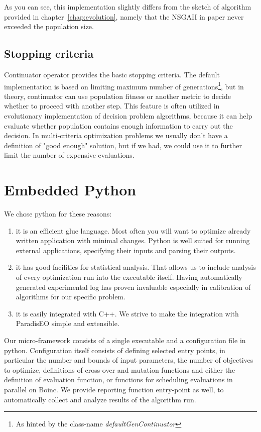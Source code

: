 \documentclass[12pt,oneside]{fithesis2}
\begin{document}
As you can see, this implementation slightly differs from the sketch of algorithm provided in chapter~\ref{chap:evolution}, namely that the NSGAII in paper\cite{deb2002fast} never exceeded the population size.

\subsection{Stopping criteria}
Continuator operator provides the basic stopping criteria. The default implementation is based on limiting maximum number of generations\footnote{As hinted by the class-name \emph{defaultGenContinuator}}, but in theory, continuator can use population fitness or another metric to decide whether to proceed with another step. This feature is often utilized in evolutionary implementation of decision problem algorithms, because it can help evaluate whether population contains enough information to carry out the decision. In multi-criteria optimization problems we usually don't have a definition of "good enough" solution, but if we had, we could use it to further limit the number of expensive evaluations.

\section{Embedded Python}

We chose python for these reasons:
\begin{enumerate}
\item it is an efficient glue language. 
Most often you will want to optimize already written application with minimal changes. Python is well suited for running external applications, specifying their inputs and parsing their outputs.
 
\item it has good facilities for statistical analysis.
That allows us to include analysis of every optimization run into the executable itself. Having automatically generated experimental log has proven invaluable especially in calibration of algorithms for our specific problem.

\item it is easily integrated with C++.
We strive to make the integration with ParadisEO simple and extensible. 
\end{enumerate}

Our micro-framework consists of a single executable and a configuration file in python. Configuration itself consists of defining selected entry points, in particular the number and bounds of input parameters, the number of objectives to optimize, definitions of cross-over and mutation functions and either the definition of evaluation function, or functions for scheduling evaluations in parallel on Boinc. We provide reporting function entry-point as well, to automatically collect and analyze results of the algorithm run.
\end{document}
